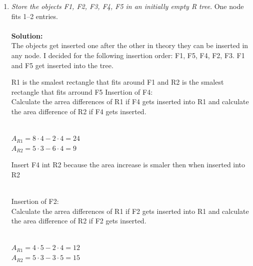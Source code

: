 \begin{enumerate}
\item
  {\em Store the objects F1, F2, F3, F4, F5 in an initially empty R tree}.
  One node fits 1--2 entries.\\\\
  {\bf Solution:}\\
  The objects get inserted one after the other in theory they can be inserted in any node.
  I decided for the following insertion order: F1, F5, F4, F2, F3.
  F1 and F5 get inserted into the tree.\\
\begin{center}
\end{center}
  

  R1 is the smalest rectangle that fits around F1 and R2 is the smalest rectangle that fits arround F5
  Insertion of F4:\\
  Calculate the arrea differences of R1 if F4 gets inserted into R1 and calculate the area difference of R2 if F4 gets inserted.\\\\
  \begin{center}
    $A_{R1} = 8 \cdot 4 - 2 \cdot 4 = 24$\\
    $A_{R2} = 5 \cdot 3 - 6 \cdot 4 = 9$
  \end{center}
    
  Insert F4 int R2 because the area increase is smaler then when inserted into R2\\\\
  \begin{center}
  \end{center}
  Insertion of F2:\\
  Calculate the arrea differences of R1 if F2 gets inserted into R1 and calculate the area difference of R2 if F2 gets inserted.\\\\
  \begin{center}
    $A_{R1} = 4 \cdot 5 - 2 \cdot 4 = 12$\\
    $A_{R2} = 5 \cdot 3 - 3 \cdot 5 = 15$
  \end{center}
    

\end{enumerate}
